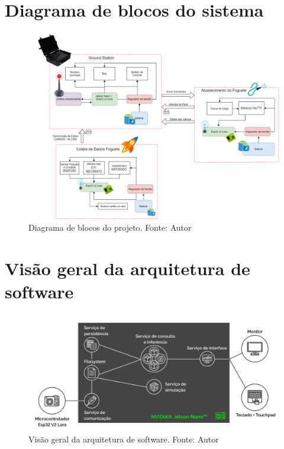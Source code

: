 \begin{apendicesenv}

\partapendices

\chapter{Diagrama de blocos do sistema}
\label{Diagrama de blocos do sistema}
\begin{figure}[htb]
    \centering
    \includegraphics[width=1\textwidth, angle=90]{figuras/diagrama pi2 (2).png}
    \caption{Diagrama de blocos do projeto. Fonte: Autor}
    \label{fig:Diagrama de Blocos}
\end{figure}

\chapter{Visão geral da arquitetura de software}
\label{Visão geral da arquitetura de software}
\begin{figure}[htb]
    \centering
    \includegraphics[width=1.2\textwidth, angle=90]{figuras/arquitetura_visao_geral}
    \caption{Visão geral da arquitetura de software. Fonte: Autor}
    \label{fig:Visão geral}
\end{figure}


\end{apendicesenv}
